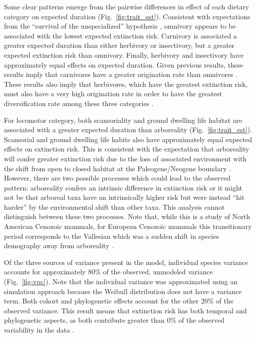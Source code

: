 \documentclass{pnastwo}
\begin{document}
\begin{article}
Some clear patterns emerge from the pairwise differences in effect of each dietary category on expected duration (Fig.~\ref{fig:trait_est}). Consistent with expectations from the ``survival of the unspecialized'' hypothesis \cite{Liow2004a,Simpson1944}, omnivory appears to be associated with the lowest expected extinction risk. Carnivory is associated a greater expected duration than either herbivory or insectivory, but a greater expected extinction risk than omnivory. Finally, herbivory and insectivory have approximately equal effects on expected duration. Given previous results, these results imply that carnivores have a greater origination rate than omnivores \cite{Price2012}. These results also imply that herbivores, which have the greatest extinction risk, must also have a very high origination rate in order to have the greatest diversification rate among these three categories \cite{Price2012}. 

For locomotor category, both scansoriality and ground dwelling life habitat are associated with a greater expected duration than arboreality (Fig.~\ref{fig:trait_est}). Scansorial and ground dwelling life habits also have approximately equal expected effects on extinction risk.  This is consistent with the expectation that arboreality will confer greater extinction risk due to the loss of associated environment with the shift from open to closed habitat at the Paleogene/Neogene boundary \cite{Blois2009}. However, there are two possible processes which could lead to the observed pattern: arboreality confers an intrinsic difference in extinction risk or it might not be that arboreal taxa have an intrinsically higher risk but were instead ``hit harder'' by the environmental shift than other taxa. This analysis cannot distinguish between these two processes. Note that, while this is a study of North American Cenozoic mammals, for European Cenozoic mammals this transitionary period corresponds to the Vallesian which was a sudden shift in species demography away from arboreality \cite{Agusti2013,Moya-Sola2005}.

Of the three sources of variance present in the model, individual species variance accounts for approximately 80\% of the observed, unmodeled variance (Fig.~\ref{fig:vpc}). Note that the individual variance was approximated using an simulation approach \cite{Goldstein2002} because the Weibull distribution does not have a variance term. Both cohort and phylogenetic effects account for the other 20\% of the observed variance. This result means that extinction risk has both temporal and phylogenetic aspects, as both contribute greater than 0\% of the observed variability in the data \cite{Housworth2004}. 


\end{article}
\end{document}
